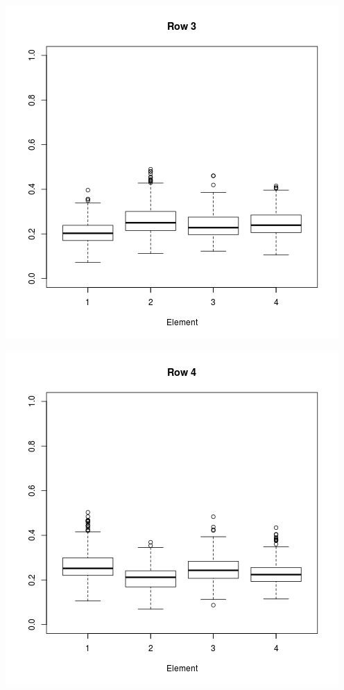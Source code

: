 \documentclass[11pt,a4paper]{report}
\begin{document}
\begin{center}
\includegraphics[scale=0.6]{row3.png}
\end{center}
\begin{center}
\includegraphics[scale=0.6]{row4.png}
\end{center}
\end{document}
